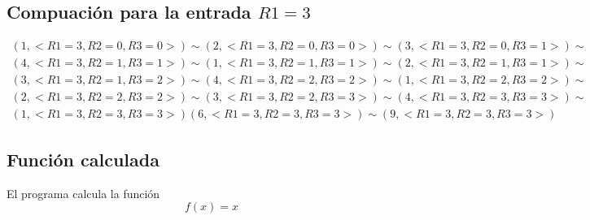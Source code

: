 	\subsection{Compuación para la entrada $R1=3$}
	\begin{equation*}\begin{gathered}
	(1, <R1=3, R2=0, R3=0>) \sim (2, <R1=3, R2=0, R3=0>) \sim (3, <R1=3, R2=0, R3=1>) \sim\\
	(4, <R1=3, R2=1, R3=1>) \sim (1, <R1=3, R2=1, R3=1>) \sim (2, <R1=3, R2=1, R3=1>) \sim\\
	(3, <R1=3, R2=1, R3=2>) \sim (4, <R1=3, R2=2, R3=2>) \sim (1, <R1=3, R2=2, R3=2>) \sim\\
	(2, <R1=3, R2=2, R3=2>) \sim (3, <R1=3, R2=2, R3=3>) \sim (4, <R1=3, R2=3, R3=3>) \sim\\
	(1, <R1=3, R2=3, R3=3>)(6, <R1=3, R2=3, R3=3>) \sim (9, <R1=3, R2=3, R3=3>)
	\end{gathered}\end{equation*}
	\subsection{Función calculada}
	El programa calcula la función
	\begin{equation*}
		f(x)=x
	\end{equation*}
